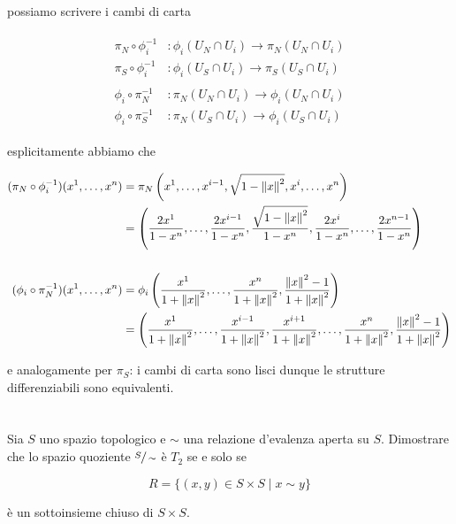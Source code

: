 possiamo scrivere i cambi di carta

\begin{align}
	\begin{split}
		\pi_{N} \circ \phi_{i}^{-1} &: \phi_{i}(U_{N} \cap U_{i}) \to \pi_{N}(U_{N} \cap U_{i})\\
		\pi_{S} \circ \phi_{i}^{-1} &: \phi_{i}(U_{S} \cap U_{i}) \to \pi_{S}(U_{S} \cap U_{i})\\\\
		\phi_{i} \circ \pi_{N}^{-1} &: \pi_{N}(U_{N} \cap U_{i}) \to \phi_{i}(U_{N} \cap U_{i})\\
		\phi_{i} \circ \pi_{S}^{-1} &: \pi_{N}(U_{S} \cap U_{i}) \to \phi_{i}(U_{S} \cap U_{i})
	\end{split}
\end{align}

esplicitamente abbiamo che

\begin{align}
	\begin{split}
		(\pi_{N} \circ \phi_{i}^{-1})(x^{1},\dots,x^{n}) &= \pi_{N} \left( x^{1}, \dots, x^{i-1}, \sqrt{1 - \norm{x}^{2}}, x^{i}, \dots, x^{n} \right)\\
		&= \left( \dfrac{2 x^{1}}{1-x^{n}}, \dots, \dfrac{2 x^{i-1}}{1-x^{n}}, \dfrac{\sqrt{1 - \norm{x}^{2}}}{1-x^{n}}, \dfrac{2 x^{i}}{1-x^{n}}, \dots, \dfrac{2 x^{n-1}}{1-x^{n}} \right)\\\\
		(\phi_{i} \circ \pi_{N}^{-1})(x^{1},\dots,x^{n}) &= \phi_{i} \left( \dfrac{x^{1}}{1 + \norm{x}^{2}}, \dots, \dfrac{x^{n}}{1 + \norm{x}^{2}}, \dfrac{\norm{x}^{2} - 1}{1 + \norm{x}^{2}} \right)\\
		&= \left( \dfrac{x^{1}}{1 + \norm{x}^{2}}, \dots, \dfrac{x^{i-1}}{1 + \norm{x}^{2}}, \dfrac{x^{i+1}}{1 + \norm{x}^{2}}, \dots, \dfrac{x^{n}}{1 + \norm{x}^{2}}, \dfrac{\norm{x}^{2} - 1}{1 + \norm{x}^{2}} \right)
	\end{split}
\end{align}

e analogamente per $ \pi_{S} $: i cambi di carta sono lisci dunque le strutture differenziabili sono equivalenti.

\tocless\section{}\label{es2-3}

\begin{tcolorbox}
	Sia $ S $ uno spazio topologico e $ \sim $ una relazione d'evalenza aperta su $ S $. Dimostrare che lo spazio quoziente $ \sfrac{S}{\sim} $ è $ T_{2} $ se e solo se
	
	\begin{equation}
		R = \{ (x,y) \in S \times S \mid x \sim y \}
	\end{equation}
	
	è un sottoinsieme chiuso di $ S \times S $.
\end{tcolorbox}


